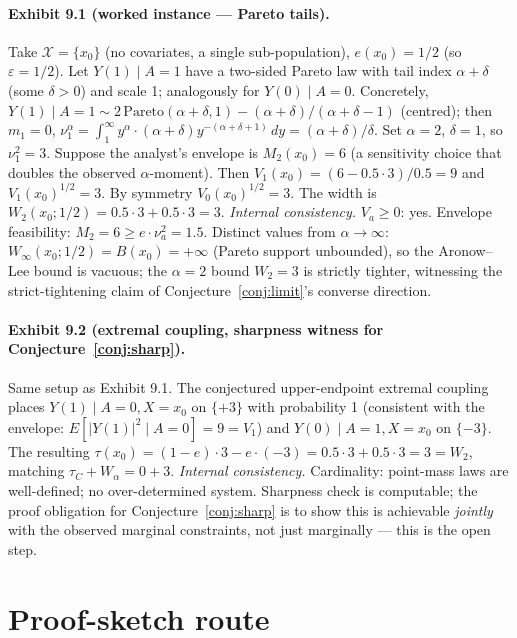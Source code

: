 \documentclass[11pt]{article}
\theoremstyle{definition}
\theoremstyle{plain}
\theoremstyle{remark}
\begin{document}
\paragraph{Exhibit 9.1 (worked instance --- Pareto tails).}
Take $\mathcal{X} = \{x_0\}$ (no covariates, a single sub-population), $e(x_0) = 1/2$
(so $\varepsilon = 1/2$). Let $Y(1) \mid A=1$ have a two-sided Pareto law with tail
index $\alpha+\delta$ (some $\delta > 0$) and scale 1; analogously for $Y(0) \mid A=0$.
Concretely, $Y(1) \mid A=1 \sim 2\,\mathrm{Pareto}(\alpha+\delta, 1) - (\alpha+\delta)/(\alpha+\delta-1)$
(centred); then $m_1 = 0$, $\nu_1^\alpha = \int_1^\infty y^\alpha \cdot (\alpha+\delta) y^{-(\alpha+\delta+1)}\,dy
= (\alpha+\delta)/\delta$. Set $\alpha=2$, $\delta=1$, so $\nu_1^2 = 3$. Suppose
the analyst's envelope is $M_2(x_0) = 6$ (a sensitivity choice that doubles the
observed $\alpha$-moment). Then $V_1(x_0) = (6 - 0.5\cdot 3)/0.5 = 9$ and
$V_1(x_0)^{1/2} = 3$. By symmetry $V_0(x_0)^{1/2} = 3$. The width is
$W_2(x_0; 1/2) = 0.5\cdot 3 + 0.5\cdot 3 = 3$. \emph{Internal consistency.}
$V_a \ge 0$: yes. Envelope feasibility: $M_2 = 6 \ge e\cdot \nu_a^2 = 1.5$.
Distinct values from $\alpha\to\infty$: $W_\infty(x_0;1/2) = B(x_0) = +\infty$
(Pareto support unbounded), so the Aronow--Lee bound is vacuous; the $\alpha=2$
bound $W_2 = 3$ is strictly tighter, witnessing the strict-tightening claim of
Conjecture~\ref{conj:limit}'s converse direction.

\paragraph{Exhibit 9.2 (extremal coupling, sharpness witness for Conjecture~\ref{conj:sharp}).}
Same setup as Exhibit 9.1. The conjectured upper-endpoint extremal coupling places
$Y(1) \mid A=0, X=x_0$ on $\{+3\}$ with probability 1 (consistent with the envelope:
$E[|Y(1)|^2 \mid A=0] = 9 = V_1$) and $Y(0)\mid A=1, X=x_0$ on $\{-3\}$. The resulting
$\tau(x_0) = (1-e)\cdot 3 - e\cdot(-3) = 0.5\cdot 3 + 0.5\cdot 3 = 3 = W_2$, matching
$\tau_C + W_\alpha = 0 + 3$. \emph{Internal consistency.} Cardinality: point-mass
laws are well-defined; no over-determined system. Sharpness check is computable;
the proof obligation for Conjecture~\ref{conj:sharp} is to show this is achievable
\emph{jointly} with the observed marginal constraints, not just marginally --- this
is the open step.

\section{Proof-sketch route}
\end{document}
